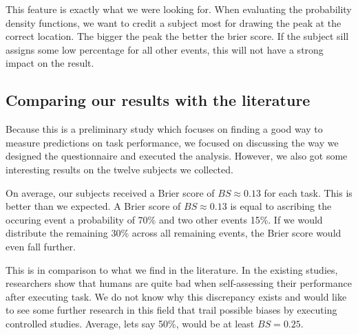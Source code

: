 \documentclass[../main/main.tex]{subfiles}
\begin{document}
	This feature is exactly what we were looking for. When evaluating the probability density functions, we want to credit a subject most for drawing the peak at the correct location. The bigger the peak the better the brier score. If the subject sill assigns some low percentage for all other events, this will not have a strong impact on the result.
	
	\subsection{Comparing our results with the literature}
	
	Because this is a preliminary study which focuses on finding a good way to measure predictions on task performance, we focused on discussing the way we designed the questionnaire and executed the analysis. However, we also got some interesting results on the twelve subjects we collected.
	
	On average, our subjects received a Brier score of $BS \approx 0.13$ for each task. This is better than we expected. A Brier score of $BS \approx 0.13$ is equal to ascribing the occuring event a probability of 70\% and two other events 15\%. If we would distribute the remaining 30\% across all remaining events, the Brier score would even fall further. 
	
	This is in comparison to what we find in the literature. In the existing studies, researchers show that humans are quite bad when self-assessing their performance after executing task. We do not know why this discrepancy exists and would like to see some further research in this field that trail possible biases by executing controlled studies. Average, lets say 50\%, would be at least $BS = 0.25$.


	
	
\end{document}

